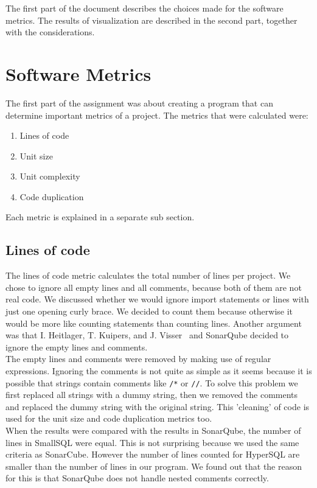 \documentclass[journal]{IEEEtran}
\begin{document}
The first part of the document describes the choices made for the software metrics. The results of visualization are described in the second part, together with the considerations.
\section{Software Metrics}

The first part of the assignment was about creating a program that can determine important metrics of a project. The metrics that were calculated were:
\begin{enumerate}[label=\Alph*.]
\item Lines of code
\item Unit size
\item Unit complexity
\item Code duplication
\end{enumerate}
Each metric is explained in a separate sub section.

\subsection{Lines of code}
The lines of code metric calculates the total number of lines per project. We chose to ignore all empty lines and all comments, because both of them are not real code. We discussed whether we would ignore import statements or lines with just one opening curly brace. We decided to count them because otherwise it would be more like counting statements than counting lines. Another argument was that I. Heitlager, T. Kuipers, and J. Visser~\cite{SIG} and SonarQube decided to ignore the empty lines and comments.\\

The empty lines and comments were removed by making use of regular expressions. Ignoring the comments is not quite as simple as it seems because it is possible that strings contain comments like \verb|/*| or \verb|//|. To solve this problem we first replaced all strings with a dummy string, then we removed the comments and replaced the dummy string with the original string. This 'cleaning' of code is used for the unit size and code duplication metrics too.\\

When the results were compared with the results in SonarQube, the number of lines in SmallSQL were equal. This is not surprising because we used the same criteria as SonarCube. However the number of lines counted for HyperSQL are smaller than the number of lines in our program. We found out that the reason for this is that SonarQube does not handle nested comments correctly.
\end{document}
